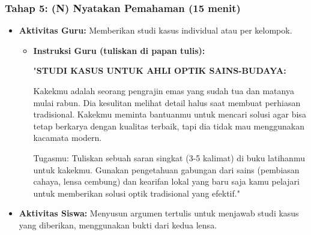 \documentclass[12pt,a4paper]{article}
\begin{document}
\subsubsection{Tahap 5: (N) Nyatakan Pemahaman (15 menit)}
\begin{itemize}
\item \textbf{Aktivitas Guru:} Memberikan studi kasus individual atau per kelompok.
    \begin{itemize}
    \item \textbf{Instruksi Guru (tuliskan di papan tulis):}
    
    "\textbf{STUDI KASUS UNTUK AHLI OPTIK SAINS-BUDAYA:}
    
    Kakekmu adalah seorang pengrajin emas yang sudah tua dan matanya mulai rabun. Dia kesulitan melihat detail halus saat membuat perhiasan tradisional. Kakekmu meminta bantuanmu untuk mencari solusi agar bisa tetap berkarya dengan kualitas terbaik, tapi dia tidak mau menggunakan kacamata modern.
    
    Tugasmu: Tuliskan sebuah saran singkat (3-5 kalimat) di buku latihanmu untuk kakekmu. Gunakan pengetahuan gabungan dari sains (pembiasan cahaya, lensa cembung) dan kearifan lokal yang baru saja kamu pelajari untuk memberikan solusi optik tradisional yang efektif."
    \end{itemize}
\item \textbf{Aktivitas Siswa:} Menyusun argumen tertulis untuk menjawab studi kasus yang diberikan, menggunakan bukti dari kedua lensa.
\end{itemize}
\end{document}
